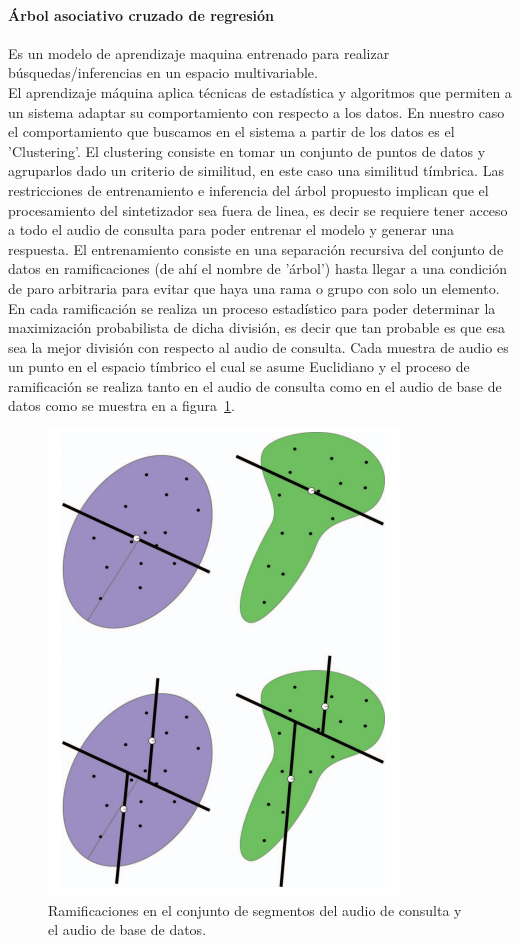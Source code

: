\documentclass[runningheads]{llncs}
\begin{document}
\paragraph{\textbf{Árbol asociativo cruzado de regresión}} Es un modelo de aprendizaje maquina entrenado para realizar búsquedas/inferencias en un espacio multivariable.\\
El aprendizaje máquina aplica técnicas de estadística y algoritmos que permiten a un sistema adaptar su comportamiento con respecto a los datos.
En nuestro caso el comportamiento que buscamos en el sistema a partir de los datos es el 'Clustering'. El clustering consiste en tomar un conjunto de puntos de datos y agruparlos dado un criterio de similitud, en este caso una similitud tímbrica.
Las restricciones de entrenamiento e inferencia del árbol propuesto implican que el procesamiento del sintetizador sea fuera de linea, es decir se requiere tener acceso a todo el audio de consulta para poder entrenar el modelo y generar una respuesta.
El entrenamiento consiste en una separación recursiva del conjunto de datos en ramificaciones (de ahí el nombre de 'árbol') hasta llegar a una condición de paro arbitraria para evitar que haya una rama o grupo con solo un elemento. En cada ramificación se realiza un proceso estadístico para poder determinar la maximización probabilista de dicha división, es decir que tan probable es que esa sea la mejor división con respecto al audio de consulta. Cada muestra de audio es un punto en el espacio tímbrico el cual se asume Euclidiano y el proceso de ramificación se realiza tanto en el audio de consulta como en el audio de base de datos como se muestra en a figura~\ref{fig1}.
	\begin{figure}[h!]
		\begin{center}
		\includegraphics[scale=0.346]{pga_006}
		\caption{Ramificaciones en el conjunto de segmentos del audio de consulta y el audio de base de datos.}
		\label{fig1}
	\end{center}
	\end{figure}\\
\end{document}

